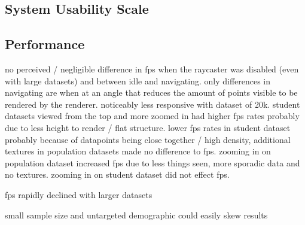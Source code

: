 {{	}

	\subsection{System Usability Scale} {
	\label{sec:sus_results}

		

		

	}

	\subsection{Performance} {
	\label{sec:performance}

		

		

		no perceived / negligible difference in fps when the raycaster was disabled (even with large datasets) and between idle and navigating. only differences in navigating are when at an angle that reduces the amount of points visible to be rendered by the renderer. noticeably less responsive with dataset of 20k. student datasets viewed from the top and more zoomed in had higher fps rates probably due to less height to render / flat structure. lower fps rates in student dataset probably because of datapoints being close together / high density, additional textures in population datasets made no difference to fps. zooming in on population dataset increased fps due to less things seen, more sporadic data and no textures. zooming in on student dataset did not effect fps.

		fps rapidly declined with larger datasets

		

	}

}

small sample size and untargeted demographic could easily skew results
